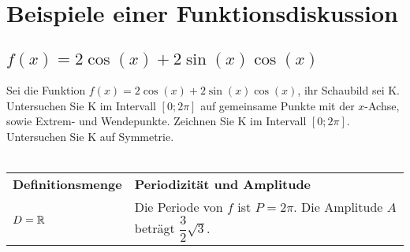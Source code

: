 \section{Beispiele einer Funktionsdiskussion}

\subsection{$f(x)=2\cos(x)+2\sin(x)\cos(x)$}
Sei die Funktion $f(x)=2\cos(x)+2\sin(x)\cos(x)$, ihr Schaubild sei K.\\
Untersuchen Sie K im Intervall $[0;2\pi]$ auf gemeinsame Punkte mit der $x$-Achse, sowie Extrem- und Wendepunkte. Zeichnen Sie K im Intervall $[0;2\pi]$. Untersuchen Sie K auf Symmetrie.
\\\\
\begin{tabular}{ p{} | p{} }
  \textbf{Definitionsmenge}  & \textbf{Periodizität und Amplitude}                                                   \\
  $D = \mathbb{R}$                  & Die Periode von $f$ ist $P=2\pi$. Die Amplitude $A$ beträgt $\dfrac{3}{2}\sqrt{3}$.   \\
\end{tabular}
\\

